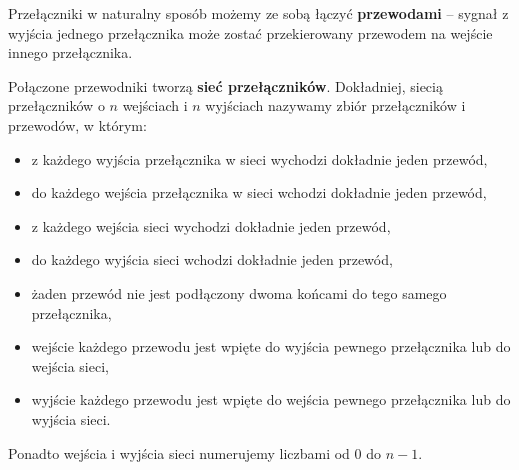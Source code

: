 \documentclass[a4paper]{article}
\theoremstyle{definition}
\begin{document}
\vspace{1em}

Przełączniki w naturalny sposób możemy ze sobą łączyć {\bf przewodami} -- sygnał z wyjścia jednego przełącznika może zostać przekierowany przewodem na wejście innego przełącznika. 

\vspace{1em}

Połączone przewodniki tworzą {\bf sieć przełączników}. Dokładniej, siecią przełączników o \(n\) wejściach i \(n\) wyjściach nazywamy zbiór przełączników i przewodów, w którym:

\begin{itemize}
    \item z każdego wyjścia przełącznika w sieci wychodzi dokładnie jeden przewód,
    \item do każdego wejścia przełącznika w sieci wchodzi dokładnie jeden przewód,
    \item z każdego wejścia sieci wychodzi dokładnie jeden przewód,
    \item  do każdego wyjścia sieci wchodzi dokładnie jeden przewód, 
    \item żaden przewód nie jest podłączony dwoma końcami do tego samego przełącznika,
    \item wejście każdego przewodu jest wpięte do wyjścia pewnego przełącznika lub do wejścia sieci,
    \item wyjście każdego przewodu jest wpięte do wejścia pewnego przełącznika lub do wyjścia sieci.
\end{itemize}

Ponadto wejścia i wyjścia sieci numerujemy liczbami od \(0\) do \(n-1\).
\end{document}
